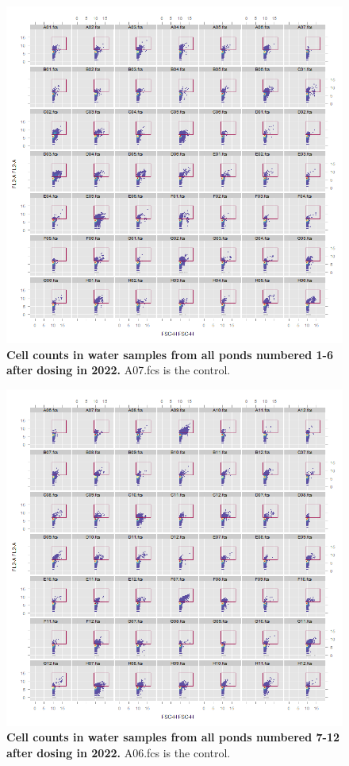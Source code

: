 \begin{figure}[H]
    \centering
    \includegraphics[scale=0.6]{./Figures/20220517_1_6}
    \caption{\textbf{Cell counts in water samples from all ponds numbered 1-6 after dosing in 2022.} A07.fcs is the control.}
    \label{fig:fc2022_post_1_6}
\end{figure}

\begin{figure}[H]
    \centering
    \includegraphics[scale=0.6]{./Figures/20220517_7_12}
    \caption{\textbf{Cell counts in water samples from all ponds numbered 7-12 after dosing in 2022.} A06.fcs is the control.}
    \label{fig:fc2022_post_7_12}
\end{figure}

